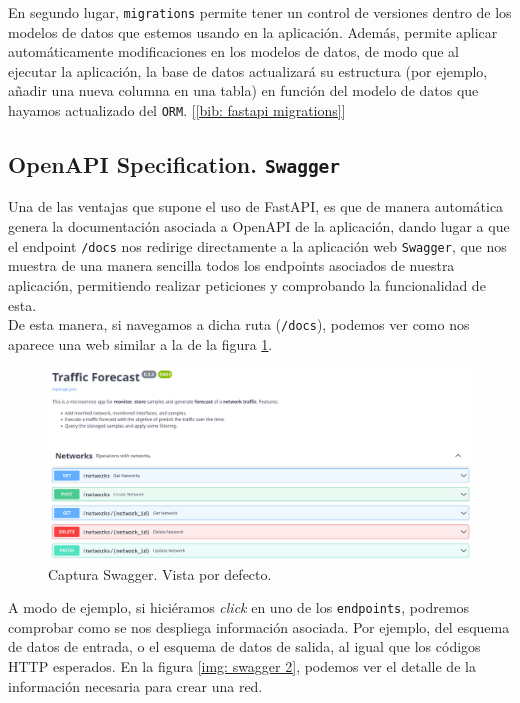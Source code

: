 \documentclass[a4paper, oneside, 12pt]{book}
\begin{document}
	\noindent En segundo lugar, \texttt{migrations} permite tener un control de versiones dentro de los modelos de datos que estemos usando en la aplicación. Además, permite aplicar automáticamente modificaciones en los modelos de datos, de modo que al ejecutar la aplicación, la base de datos actualizará su estructura (por ejemplo, añadir una nueva columna en una tabla) en función del modelo de datos que hayamos actualizado del \texttt{ORM}. [\ref{bib: fastapi migrations}]
	
	\pagebreak
	
	\subsection{OpenAPI Specification. \texttt{Swagger}}
	
	\noindent Una de las ventajas que supone el uso de FastAPI, es que de manera automática genera la documentación asociada a OpenAPI de la aplicación, dando lugar a que el endpoint \texttt{/docs} nos redirige directamente a la aplicación web \texttt{Swagger}, que nos muestra de una manera sencilla todos los endpoints asociados de nuestra aplicación, permitiendo realizar peticiones y comprobando la funcionalidad de esta. \\
	
	\noindent De esta manera, si navegamos a dicha ruta (\texttt{/docs}), podemos ver como nos aparece una web similar a la de la figura \ref{img: swagger 1}.
	
	\begin{figure}[h!]
		\includegraphics[width=1.2\textwidth,center]{img/swagger_1.png}
		\caption{Captura Swagger. Vista por defecto.}
		\label{img: swagger 1}
	\end{figure}

	\noindent A modo de ejemplo, si hiciéramos \textit{click} en uno de los \texttt{endpoints}, podremos comprobar como se nos despliega información asociada. Por ejemplo, del esquema de datos de entrada, o el esquema de datos de salida, al igual que los códigos HTTP esperados. En la figura \ref{img: swagger 2}, podemos ver el detalle de la información necesaria para crear una red. \\
	
\end{document}
